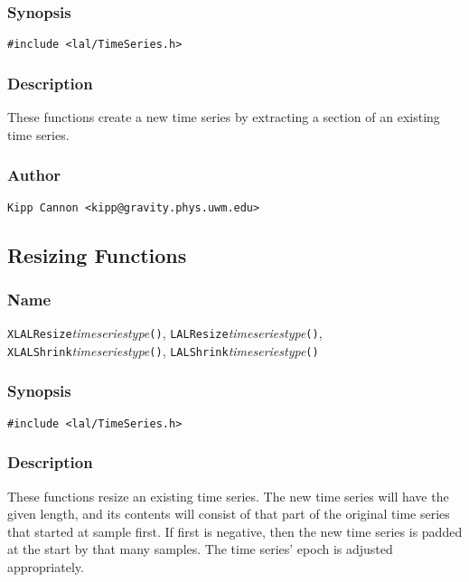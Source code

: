 \subsubsection{Synopsis}

\begin{verbatim}
#include <lal/TimeSeries.h>
\end{verbatim}


\subsubsection{Description}

These functions create a new time series by extracting a section of an
existing time series.

\subsubsection{Author}

\verb|Kipp Cannon <kipp@gravity.phys.uwm.edu>|


\subsection{Resizing Functions}

\subsubsection{Name}

\texttt{XLALResize}\textit{timeseriestype}\texttt{()},
\texttt{LALResize}\textit{timeseriestype}\texttt{()},
\texttt{XLALShrink}\textit{timeseriestype}\texttt{()},
\texttt{LALShrink}\textit{timeseriestype}\texttt{()}

\subsubsection{Synopsis}

\begin{verbatim}
#include <lal/TimeSeries.h>
\end{verbatim}


\subsubsection{Description}

These functions resize an existing time series.  The new time series will
have the given length, and its contents will consist of that part of the
original time series that started at sample first.  If first is negative,
then the new time series is padded at the start by that many samples.  The
time series' epoch is adjusted appropriately.

